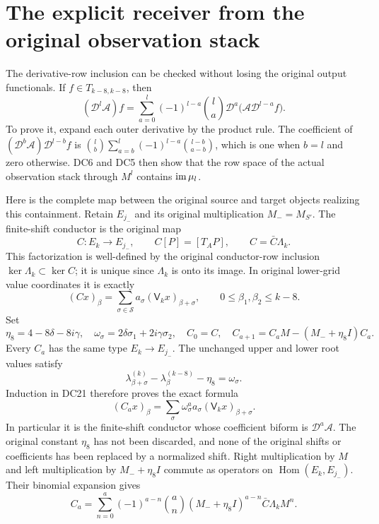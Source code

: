 \section{The explicit receiver from the original observation stack}
The derivative-row inclusion can be checked without losing the
original output functionals.  If $f\in T_{k-8,k-8}$, then
\[
 (\mathcal D^l\mathcal A)f
  =\sum_{a=0}^l(-1)^{l-a}\binom la
      \mathcal D^a\bigl(\mathcal A\mathcal D^{l-a}f\bigr).
                                                                    \tag{DC18}
\]
To prove it, expand each outer derivative by the product rule.  The
coefficient of $(\mathcal D^b\mathcal A)\mathcal D^{l-b}f$ is
$\binom lb\sum_{a=b}^l(-1)^{l-a}\binom{l-b}{a-b}$, which is one
when $b=l$ and zero otherwise.  DC6 and DC5 then show that the row
space of the actual observation stack through $M^l$ contains
$\operatorname{im}\mu_l$.

Here is the complete map between the original source and target
objects realizing this containment.  Retain $E_{j_-}$ and its
original multiplication $M_-=M_{S'}$.  The finite-shift conductor
is the original map
\[
 C:E_k\to E_{j_-},\qquad C[P]=[T_AP],\qquad
 C=\bar C\Lambda_k.                                             \tag{DC19}
\]
This factorization is well-defined by the original conductor-row
inclusion $\ker\Lambda_k\subset\ker C$; it is unique since
$\Lambda_k$ is onto its image.  In original lower-grid value
coordinates it is exactly
\[
 (Cx)_\beta=\sum_{\sigma\in\mathcal S}
                        a_\sigma(\mathsf V_kx)_{\beta+\sigma},
 \qquad 0\le\beta_1,\beta_2\le k-8.                             \tag{DC20}
\]
Set
\[
 \eta_8=4-8\delta-8i\gamma,
 \quad\omega_\sigma=2\delta\sigma_1+2i\gamma\sigma_2,
 \quad C_0=C,\quad
 C_{a+1}=C_aM-(M_-+\eta_8I)C_a.                                 \tag{DC21}
\]
Every $C_a$ has the same type $E_k\to E_{j_-}$.  The unchanged
upper and lower root values satisfy
\[
 \lambda^{(k)}_{\beta+\sigma}
   -\lambda^{(k-8)}_\beta-\eta_8=\omega_\sigma.
\]
Induction in DC21 therefore proves the exact formula
\[
 (C_ax)_\beta=\sum_\sigma
                  \omega_\sigma^a a_\sigma(\mathsf V_kx)_{\beta+\sigma}.
                                                                    \tag{DC22}
\]
In particular it is the finite-shift conductor whose coefficient
biform is $\mathcal D^a\mathcal A$.  The original constant $\eta_8$
has not been discarded, and none of the original shifts or coefficients
has been replaced by a normalized shift.
Right multiplication by $M$ and left multiplication by
$M_-+\eta_8I$ commute as operators on $\operatorname{Hom}(E_k,E_{j_-})$.
Their binomial expansion gives
\[
 C_a=\sum_{n=0}^a(-1)^{a-n}\binom an
       (M_-+\eta_8I)^{a-n}\bar C\Lambda_k M^n.                   \tag{DC23}
\]

